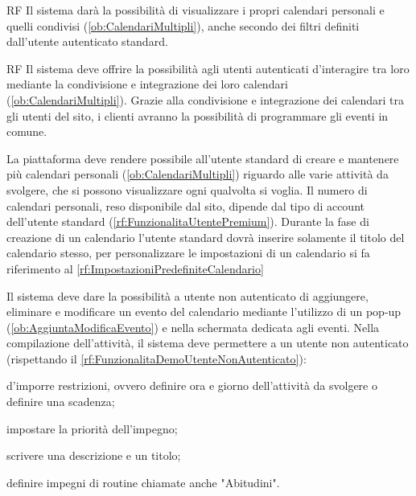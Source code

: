 \begin{listaPersonale}{RF}
	 Il sistema darà la possibilità di visualizzare i propri calendari personali e quelli condivisi (\ref{ob:CalendariMultipli}), anche secondo dei filtri definiti dall'utente autenticato standard.
	\begin{listaPersonale2}{RF}
		 Il sistema deve offrire la possibilità agli utenti autenticati d'interagire tra loro mediante la condivisione e integrazione dei loro calendari (\ref{ob:CalendariMultipli}). Grazie alla condivisione e integrazione dei calendari tra gli utenti del sito, i clienti avranno la possibilità di programmare gli eventi in comune.

		 La piattaforma deve rendere possibile all'utente standard di creare e mantenere più calendari personali (\ref{ob:CalendariMultipli}) riguardo alle varie attività da svolgere, che si possono visualizzare ogni qualvolta si voglia. Il numero di calendari personali, reso disponibile dal sito, dipende dal tipo di account dell'utente standard (\ref{rf:FunzionalitaUtentePremium}). Durante la fase di creazione di un calendario l'utente standard dovrà inserire solamente il titolo del calendario stesso, per personalizzare le impostazioni di un calendario si fa riferimento al \ref{rf:ImpostazioniPredefiniteCalendario}
	\end{listaPersonale2}

	 Il sistema deve dare la possibilità a utente non autenticato di aggiungere, eliminare e modificare un evento del calendario mediante l'utilizzo di un pop-up (\ref{ob:AggiuntaModificaEvento}) e nella schermata dedicata agli eventi. Nella compilazione dell'attività, il sistema deve permettere a un utente non autenticato (rispettando il \ref{rf:FunzionalitaDemoUtenteNonAutenticato}):
	\begin{listaPersonale2}[RF]{}
		 d'imporre restrizioni, ovvero definire ora e giorno dell'attività da svolgere o definire una scadenza;

		 impostare la priorità dell'impegno;

		 scrivere una descrizione e un titolo;

		 definire impegni di routine chiamate anche "Abitudini".


\end{listaPersonale2}
\end{listaPersonale}
